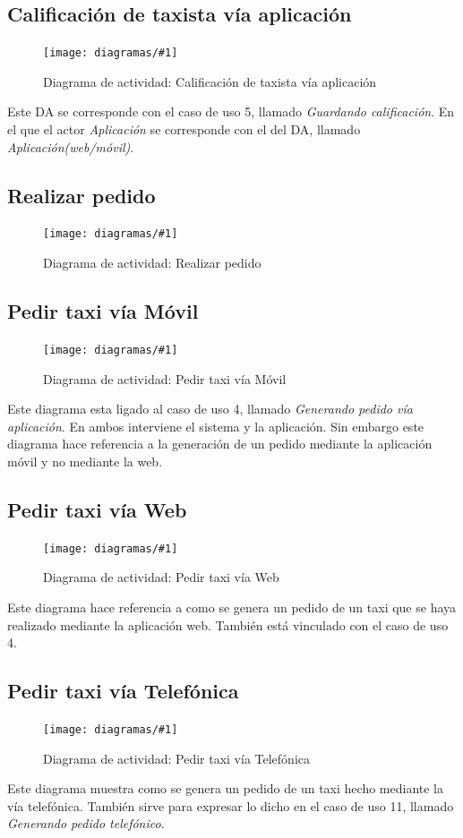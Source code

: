 \documentclass[a4paper, 10pt, twoside]{article}
\newcommand{\diagramavfig}[2]{%
  \begin{figure}[H]
    \texttt{[image: diagramas/\#1]}%
    \caption{#2}
    \label{fig:#1}
  \end{figure}
}
\begin{document}
\subsection{Calificación de taxista vía aplicación}
\label{sec:calificacion-aplicacion}
\diagramavfig{da-calificar-taxista}{Diagrama de actividad: Calificación de taxista vía aplicación}

Este DA se corresponde con el caso de uso 5, llamado \emph{Guardando calificación}. En el que el actor \emph{Aplicación} se corresponde con el del DA, llamado \emph{Aplicación(web/móvil)}.

\subsection{Realizar pedido}
\label{sec:da-pedido-alto-nivel}
\diagramavfig{da-pedido-alto-nivel}{Diagrama de actividad: Realizar pedido}

\subsection{Pedir taxi vía M\'ovil}
\label{sec:pedido-aplicacion-movil}
\diagramavfig{da-realizar-pedido-aplicacion-movil}{Diagrama de actividad: Pedir taxi vía M\'ovil}

Este diagrama esta ligado al caso de uso 4, llamado \emph{Generando pedido vía aplicación}. En ambos interviene el sistema y la aplicación. Sin embargo este diagrama hace referencia a la generación de un pedido mediante la aplicación móvil y no mediante la web. 

\subsection{Pedir taxi vía Web}
\label{sec:pedido-aplicacion-web}
\diagramavfig{da-realizar-pedido-aplicacion-web}{Diagrama de actividad: Pedir taxi vía Web}

Este diagrama hace referencia a como se genera un pedido de un taxi que se haya realizado mediante la aplicación web. También está vinculado con el caso de uso 4.

\subsection{Pedir taxi vía Telefónica}
\label{sec:pedido-aplicacion-telefonica}
\diagramavfig{da-realizar-pedido-aplicacion-telefonica}{Diagrama de actividad: Pedir taxi vía Telefónica}

Este diagrama muestra como se genera un pedido de un taxi hecho mediante la vía telefónica. También sirve para expresar lo dicho en el caso de uso 11, llamado \emph{Generando pedido telefónico}. 
\end{document}
